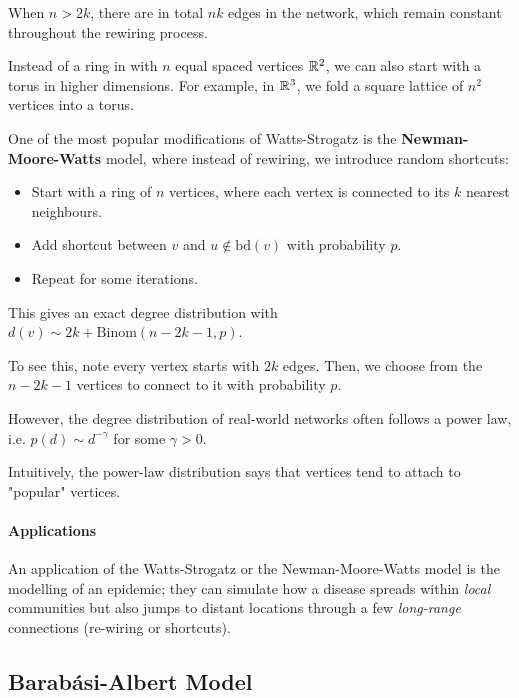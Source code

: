 \documentclass{article}
\begin{document}
When $n>2k$, there are in total $nk$ edges in the network, which remain constant throughout the rewiring process.

\begin{remark}
    Instead of a ring in with $n$ equal spaced vertices $\mathbb{R}^2$, we can also start with a torus in higher dimensions. For example, in $\mathbb{R}^3$, we fold a square lattice of $n^2$ vertices into a torus.
\end{remark}  

One of the most popular modifications of Watts-Strogatz is the \textbf{Newman-Moore-Watts} model, where instead of rewiring, we introduce random shortcuts:
\begin{itemize}
    \item Start with a ring of $n$ vertices, where each vertex is connected to its $k$ nearest neighbours.
    \item Add shortcut between $v$ and $u\notin \text{bd}(v)$ with probability $p$.
    \item Repeat for some iterations.
\end{itemize}

This gives an exact degree distribution with $d(v) \sim 2k+\mathrm{Binom}(n-2k-1, p)$.
\begin{unexaminable}
    To see this, note every vertex starts with $2k$ edges. Then, we choose from the $n-2k-1$ vertices to connect to it with probability $p$.
\end{unexaminable}

However, the degree distribution of real-world networks often follows a power law, i.e. $p(d)\sim d^{-\gamma}$ for some $\gamma>0$.  

\begin{remark}
    Intuitively, the power-law distribution says that vertices tend to attach to "popular" vertices.
\end{remark}

\paragraph{Applications}
    An application of the Watts-Strogatz or the Newman-Moore-Watts model is the modelling of an epidemic; they can simulate how a disease spreads within \textit{local} communities but also jumps to distant locations through a few \textit{long-range} connections (re-wiring or shortcuts).  


\subsection{Barab\'{a}si-Albert Model}
\end{document}
